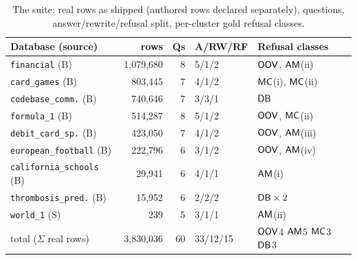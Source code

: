 \begin{table}[t]
\centering
\scriptsize
\setlength{\tabcolsep}{2.4pt}
\renewcommand{\arraystretch}{0.95}
\caption{The suite: real rows as shipped (authored rows declared
separately), questions, answer/rewrite/refusal split, per-cluster gold
refusal classes.}
\label{tab:suite}
\begin{tabular}{@{}lrrll@{}}
\toprule
Database (source) & rows & Qs & A/RW/RF & Refusal classes\\
\midrule
\texttt{financial} (B)        & 1{,}079{,}680 & 8 & 5/1/2 & $\mathsf{OOV}$, $\mathsf{AM}$(ii)\\
\texttt{card\_games} (B)      &   803{,}445 & 7 & 4/1/2 & $\mathsf{MC}$(i), $\mathsf{MC}$(ii)\\
\texttt{codebase\_comm.} (B)  &   740{,}646 & 7 & 3/3/1 & $\mathsf{DB}$\\
\texttt{formula\_1} (B)       &   514{,}287 & 8 & 5/1/2 & $\mathsf{OOV}$, $\mathsf{MC}$(ii)\\
\texttt{debit\_card\_sp.} (B) &   423{,}050 & 7 & 4/1/2 & $\mathsf{OOV}$, $\mathsf{AM}$(iii)\\
\texttt{european\_football} (B)& 222{,}796 & 6 & 3/1/2 & $\mathsf{OOV}$, $\mathsf{AM}$(iv)\\
\texttt{california\_schools} (B)& 29{,}941 & 6 & 4/1/1 & $\mathsf{AM}$(i)\\
\texttt{thrombosis\_pred.} (B)&    15{,}952 & 6 & 2/2/2 & $\mathsf{DB}\times2$\\
\texttt{world\_1} (S)         &       239 & 5 & 3/1/1 & $\mathsf{AM}$(ii)\\
\midrule
total ($\Sigma$ real rows)    & 3{,}830{,}036 & 60 & 33/12/15 &
  $\mathsf{OOV}$4 $\mathsf{AM}$5 $\mathsf{MC}$3 $\mathsf{DB}$3\\
\bottomrule
\end{tabular}
\end{table}


